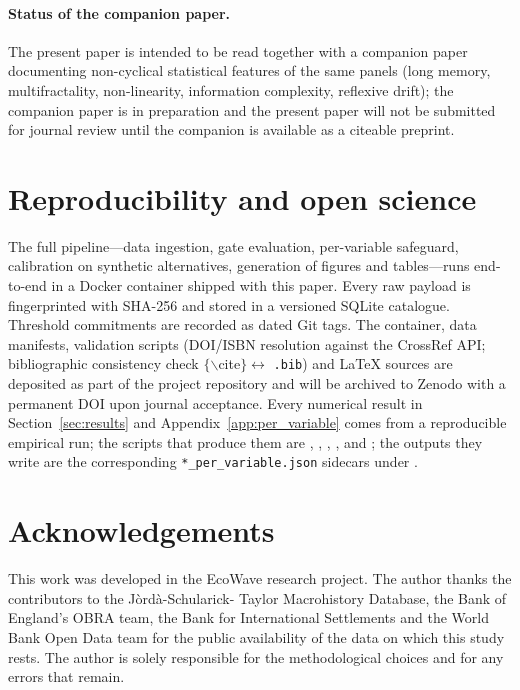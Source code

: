 \paragraph{Status of the companion paper.}
The present paper is intended to be read together with a
companion paper documenting non-cyclical statistical features
of the same panels (long memory, multifractality, non-linearity,
information complexity, reflexive drift); the companion paper is
in preparation and the present paper will not be submitted for
journal review until the companion is available as a citeable
preprint.

\section*{Reproducibility and open science}

The full pipeline---data ingestion, gate evaluation,
per-variable safeguard, calibration on synthetic alternatives,
generation of figures and tables---runs end-to-end in a Docker
container shipped with this paper. Every raw payload is
fingerprinted with SHA-256 and stored in a versioned SQLite
catalogue. Threshold commitments are recorded as dated Git tags.
The container, data manifests, validation scripts (DOI/ISBN
resolution against the CrossRef API; bibliographic consistency
check \(\{\backslash\)cite\(\}\leftrightarrow\) \texttt{.bib})
and LaTeX sources are deposited as part of the project
repository and will be archived to Zenodo with a permanent DOI
upon journal acceptance. Every numerical result in
Section~\ref{sec:results} and Appendix~\ref{app:per_variable}
comes from a reproducible empirical run; the scripts that
produce them are ,
,
,
,
 and
; the outputs they
write are the corresponding \texttt{*\_per\_variable.json}
sidecars under .

\section*{Acknowledgements}

This work was developed in the EcoWave research project. The
author thanks the contributors to the J\`ord\`a-Schularick-
Taylor Macrohistory Database, the Bank of England's OBRA team,
the Bank for International Settlements and the World Bank Open
Data team for the public availability of the data on which this
study rests. The author is solely responsible for the
methodological choices and for any errors that remain.

